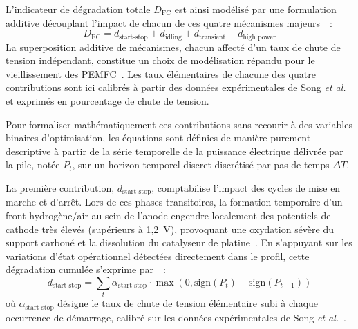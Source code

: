 L'indicateur de dégradation totale $D_{\text{FC}}$ est ainsi modélisé par une formulation additive découplant l'impact de chacun de ces quatre mécanismes majeurs~\cite{pei_quick_2008}~:
\begin{equation}
    D_{\text{FC}} = d_{\text{start-stop}} + d_{\text{idling}} + d_{\text{transient}} + d_{\text{high power}}
    \label{eq:degradation_fc}
\end{equation}
La superposition additive de mécanismes, chacun affecté d'un taux de chute de tension indépendant, constitue un choix de modélisation répandu pour le vieillissement des PEMFC~\cite{nguyen_comprehensive_2023}\cite{foniok_mechanisms_2025}. Les taux élémentaires de chacune des quatre contributions sont ici calibrés à partir des données expérimentales de Song \textit{et al.}~\cite{song_pontryagins_2020} et exprimés en pourcentage de chute de tension.

Pour formaliser mathématiquement ces contributions sans recourir à des variables binaires d'optimisation, les équations sont définies de manière purement descriptive à partir de la série temporelle de la puissance électrique délivrée par la pile, notée $P_t$, sur un horizon temporel discret discrétisé par pas de temps $\Delta T$. 

La première contribution, $d_{\text{start-stop}}$, comptabilise l'impact des cycles de mise en marche et d'arrêt. Lors de ces phases transitoires, la formation temporaire d'un front hydrogène/air au sein de l'anode engendre localement des potentiels de cathode très élevés (supérieurs à 1,2~V), provoquant une oxydation sévère du support carboné et la dissolution du catalyseur de platine~\cite{foniok_mechanisms_2025}\cite{pei_quick_2008}. En s'appuyant sur les variations d'état opérationnel détectées directement dans le profil, cette dégradation cumulée s'exprime par~\cite{pei_quick_2008}~:
\begin{equation}
    d_{\text{start-stop}} = \sum_t \alpha_{\text{start-stop}} \cdot \max\left(0, \text{sign}(P_t) - \text{sign}(P_{t-1})\right)
    \label{eq:fc_start_stop}
\end{equation}
où $\alpha_{\text{start-stop}}$ désigne le taux de chute de tension élémentaire subi à chaque occurrence de démarrage, calibré sur les données expérimentales de Song \textit{et al.}~\cite{song_pontryagins_2020}.

